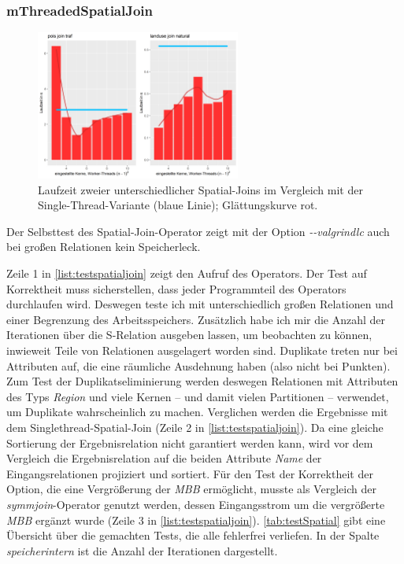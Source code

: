 \documentclass[a4paper,12pt,twoside]{article}
\newcommand{\Fb}[1]{\textit{#1}} %
\begin{document}
\subsubsection{mThreadedSpatialJoin}

\begin{figure}
	\centering
	\includegraphics[width=0.60\textwidth]{Bilder/sj_kerne.png}
	\caption{Laufzeit zweier unterschiedlicher Spatial-Joins im Vergleich mit der Single-Thread-Variante (blaue Linie); Glättungskurve rot.}
	\label{img:sjKern}
\end{figure}

Der Selbsttest des Spatial-Join-Operator zeigt mit der Option \Fb{-{}-valgrindlc} auch bei großen Relationen kein Speicherleck.

Zeile 1 in \autoref{list:testspatialjoin} zeigt den Aufruf des Operators. Der Test auf Korrektheit muss sicherstellen, dass jeder Programmteil des Operators durchlaufen wird. Deswegen teste ich mit unterschiedlich großen Relationen und einer Begrenzung des Arbeitsspeichers. Zusätzlich habe ich mir die Anzahl der Iterationen über die S-Relation ausgeben lassen, um beobachten zu können, inwieweit Teile von Relationen ausgelagert worden sind. Duplikate treten nur bei Attributen auf, die eine räumliche Ausdehnung haben (also nicht bei Punkten). Zum Test der Duplikatseliminierung werden deswegen Relationen mit Attributen des Typs \Fb{Region} und viele Kernen -- und damit vielen Partitionen -- verwendet, um Duplikate wahrscheinlich zu machen. Verglichen werden die Ergebnisse mit dem Singlethread-Spatial-Join (Zeile 2 in \autoref{list:testspatialjoin}). Da eine gleiche Sortierung der Ergebnisrelation nicht garantiert werden kann, wird vor dem Vergleich die Ergebnisrelation auf die beiden Attribute \Fb{Name} der Eingangsrelationen projiziert und sortiert. Für den Test der Korrektheit der Option, die eine Vergrößerung der \Fb{MBB} ermöglicht, musste als Vergleich der \Fb{symmjoin}-Operator genutzt werden, dessen Eingangsstrom um die vergrößerte \Fb{MBB} ergänzt wurde (Zeile 3 in \autoref{list:testspatialjoin}). \autoref{tab:testSpatial} gibt eine Übersicht über die gemachten Tests, die alle fehlerfrei verliefen. In der Spalte \Fb{speicherintern} ist die Anzahl der Iterationen dargestellt. 
\end{document}
